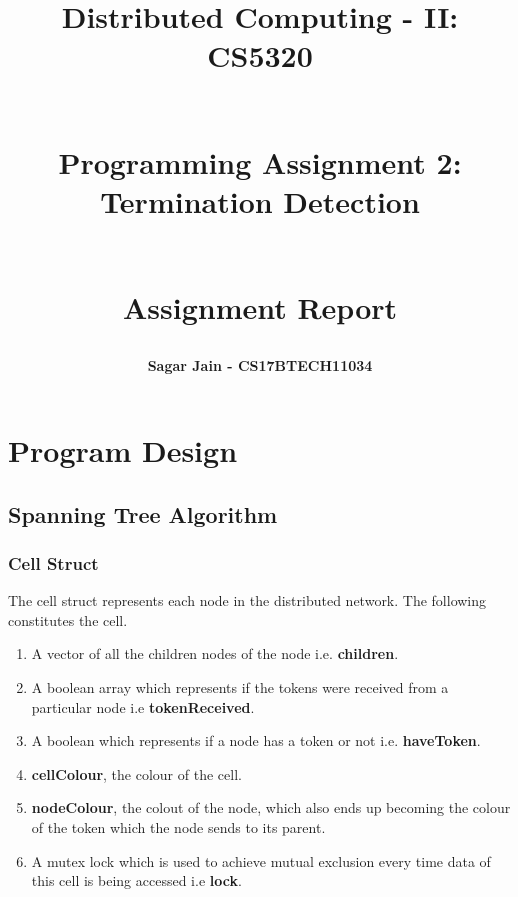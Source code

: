 \documentclass[a4paper,12pt]{report}
\begin{document}
\title{
\textbf{Distributed Computing - II: CS5320}\\~\\
\begin{huge}
\textbf{Programming Assignment 2:\\Termination Detection
\\~\\}
\end{huge}
\begin{huge}
\textbf{Assignment Report}
\end{huge}
}
\author{\textbf{Sagar Jain - CS17BTECH11034}\\}
\maketitle
\begin{large}
\tableofcontents
\end{large}
\newpage
\section{Program Design}
\subsection{Spanning Tree Algorithm}
\subsubsection{Cell Struct}
The cell struct represents each node in the distributed network. The following constitutes the cell.
\begin{enumerate}
\item A vector of all the children nodes of the node i.e. \textbf{children}.
\item A boolean array which represents if the tokens were received from a particular node i.e \textbf{tokenReceived}.
\item A boolean which represents if a node has a token or not i.e. \textbf{haveToken}.
\item \textbf{cellColour}, the colour of the cell.
\item \textbf{nodeColour}, the colout of the node, which also ends up becoming the colour of the token which the node sends to its parent.
\item A mutex lock which is used to achieve mutual exclusion every time data of this cell is being accessed i.e \textbf{lock}.
\end{enumerate}
\end{document}
